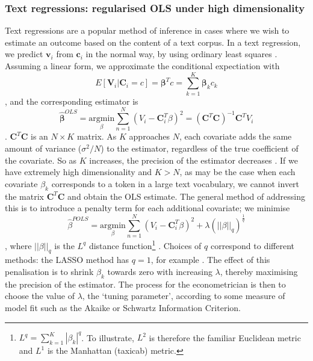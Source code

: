 \documentclass[12pt,a4]{article}
\begin{document}
\subsubsection{Text regressions: regularised OLS under high dimensionality}
Text regressions are a popular method of inference in cases where we wish to estimate an outcome based on the content of a text corpus.  In a text regression, we predict \(\mathbf{v}_i\) from \(\mathbf{c}_i\) in the normal way, by using ordinary least squares \parencite[541]{gentzkowTextData2019}. Assuming a linear form, we approximate the conditional expectiation with
\[
    E[\mathbf{V}_i | \mathbf{C}_i = c] = \mathbf{\beta}^T c = \sum^K_{k=1} \mathbf{\beta}_k c_k
\]
, and the corresponding estimator is 
\[ 
    \hat{\mathbf{\beta}}^{OLS} = \underset{\beta}{\mathrm{argmin }} \sum^N_{n=1} (V_i - \mathbf{C}_i^T \beta)^2 = (\mathbf{C}^T \mathbf{C})^{-1}\mathbf{C}^T V_i
\]. \(\mathbf{C}^T \mathbf{C}\) is an \(N \times K\) matrix. As \(K\) approaches \(N\), each covariate adds the same amount of variance (\(\sigma^2 / N\)) to the estimator, regardless of the true coefficient of the covariate. So as \(K\) increases, the precision of the estimator decreases \parencite[101]{davidsonEconometricTheoryMethods2004}. If we have extremely high dimensionality and \(K > N\), as may be the case when each covariate \(\beta_k\) corresponds to a token in a large text vocabulary, we cannot invert the matrix \(\mathbf{C}^T \mathbf{C}\) and obtain the OLS estimate. The general method of addressing this is to introduce a penalty term for each additional covariate; we minimise 
\[
    \hat{\beta}^{POLS} = \underset{\beta}{\mathrm{argmin }} \sum^N_{n=1} (V_i - \mathbf{C}_i^T \beta)^2  + \lambda (||\beta||_q)^{\frac{1}{q}}
\], where \(||\beta||_q\) is the  \(L^q\) distance function\footnote{\(L^q = \sum^K_{k=1}|\beta_k|^q\). To illustrate, \(L^2\) is therefore the familiar Euclidean metric and \(L^1\) is the Manhattan (taxicab) metric.} \parencite[696]{atheyMachineLearningMethods2019a}. Choices of \(q\) correspond to different methods: the LASSO method has \(q =1\), for example \parencite{tibshiraniRegressionShrinkageSelection1996}.  The effect of this penalisation is to shrink \(\beta_k\) towards zero with increasing \(\lambda\), thereby maximising the precision of the estimator. The process for the econometrician is then to choose the value of \(\lambda\), the `tuning parameter', according to some measure of model fit such as the Akaike or Schwartz Information Criterion.    
\end{document}
